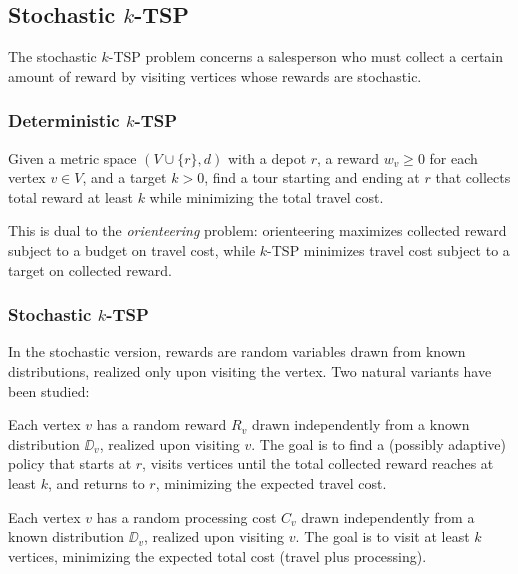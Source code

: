 \subsection{Stochastic $k$-TSP}

The stochastic $k$-TSP problem concerns a salesperson who must collect a certain amount of reward by visiting vertices whose rewards are stochastic.

\subsubsection{Deterministic $k$-TSP}

\begin{definition}
    Given a metric space $(V \cup \{r\}, d)$ with a depot $r$, a reward $w_v \ge 0$ for each vertex $v \in V$, and a target $k > 0$, find a tour starting and ending at $r$ that collects total reward at least $k$ while minimizing the total travel cost.
\end{definition}

This is dual to the \emph{orienteering} problem: orienteering maximizes collected reward subject to a budget on travel cost, while $k$-TSP minimizes travel cost subject to a target on collected reward.

\subsubsection{Stochastic $k$-TSP}

In the stochastic version, rewards are random variables drawn from known distributions, realized only upon visiting the vertex. Two natural variants have been studied:

\begin{definition}
    Each vertex $v$ has a random reward $R_v$ drawn independently from a known distribution $\DD_v$, realized upon visiting $v$. The goal is to find a (possibly adaptive) policy that starts at $r$, visits vertices until the total collected reward reaches at least $k$, and returns to $r$, minimizing the expected travel cost.
\end{definition}

\begin{definition}
    Each vertex $v$ has a random processing cost $C_v$ drawn independently from a known distribution $\DD_v$, realized upon visiting $v$. The goal is to visit at least $k$ vertices, minimizing the expected total cost (travel plus processing).
\end{definition}

